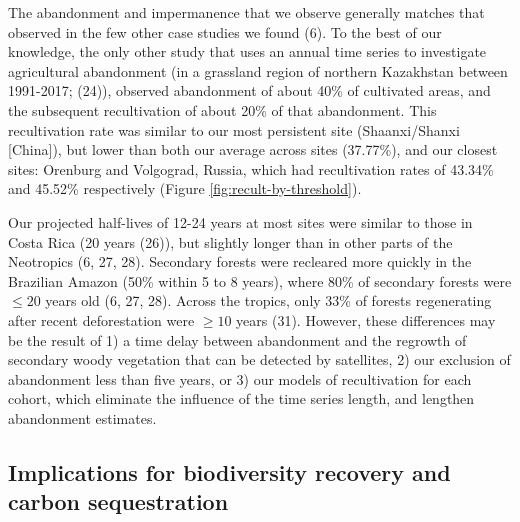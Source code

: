 \documentclass[9pt,twocolumn,twoside,]{pnas-new}
\begin{document}
The abandonment and impermanence that we observe generally matches that observed in the few other case studies we found (6).
To the best of our knowledge, the only other study that uses an annual time series to investigate agricultural abandonment (in a grassland region of northern Kazakhstan between 1991-2017; (24)), observed abandonment of about 40\% of cultivated areas, and the subsequent recultivation of about 20\% of that abandonment.
This recultivation rate was similar to our most persistent site (Shaanxi/Shanxi {[}China{]}), but lower than both our average across sites (37.77\%), and our closest sites: Orenburg and Volgograd, Russia, which had recultivation rates of 43.34\% and 45.52\% respectively (Figure \ref{fig:recult-by-threshold}).

Our projected half-lives of 12-24 years at most sites were similar to those in Costa Rica (20 years (26)), but slightly longer than in other parts of the Neotropics (6, 27, 28).
Secondary forests were recleared more quickly in the Brazilian Amazon (50\% within 5 to 8 years), where 80\% of secondary forests were \(\leq20\) years old (6, 27, 28).
Across the tropics, only 33\% of forests regenerating after recent deforestation were \(\geq10\) years (31).
However, these differences may be the result of 1) a time delay between abandonment and the regrowth of secondary woody vegetation that can be detected by satellites, 2) our exclusion of abandonment less than five years, or 3) our models of recultivation for each cohort, which eliminate the influence of the time series length, and lengthen abandonment estimates.

\hypertarget{implications-for-biodiversity-recovery-and-carbon-sequestration}{%
\subsection{Implications for biodiversity recovery and carbon sequestration}\label{implications-for-biodiversity-recovery-and-carbon-sequestration}}
\end{document}
